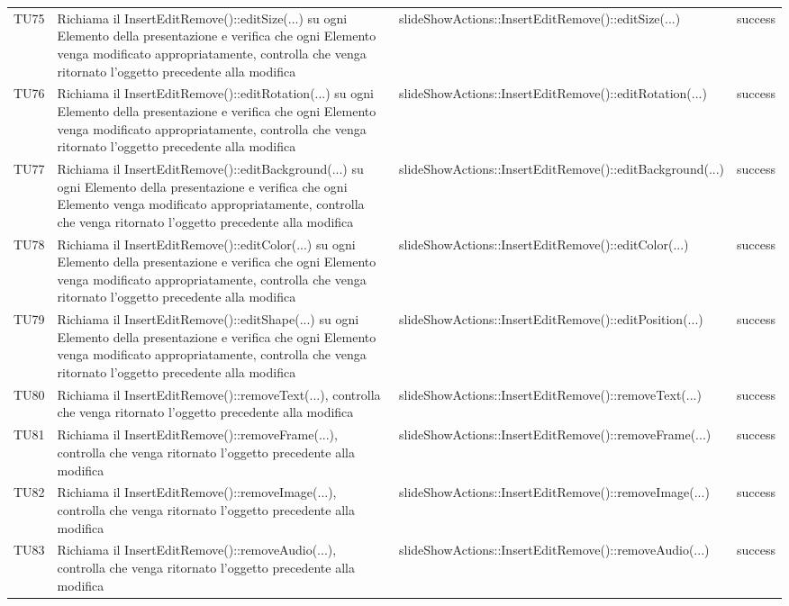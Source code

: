 \begin{longtable} [c]{| p{2cm} | p{6cm} |p{3cm} | p{2cm} |}
		 		 TU75 & Richiama il InsertEditRemove()::editSize(...) su ogni Elemento\ped{g} della presentazione e verifica che ogni Elemento\ped{g} venga modificato appropriatamente, controlla che venga ritornato l'oggetto precedente alla modifica   & slideShowActions::InsertEditRemove()::editSize(...) & success \\
		 		 TU76 & Richiama il InsertEditRemove()::editRotation(...) su ogni Elemento\ped{g} della presentazione e verifica che ogni Elemento\ped{g} venga modificato appropriatamente, controlla che venga ritornato l'oggetto precedente alla modifica   & slideShowActions::InsertEditRemove()::editRotation(...) & success \\
		 		 TU77 & Richiama il InsertEditRemove()::editBackground(...) su ogni Elemento\ped{g} della presentazione e verifica che ogni Elemento\ped{g} venga modificato appropriatamente, controlla che venga ritornato l'oggetto precedente alla modifica   & slideShowActions::InsertEditRemove()::editBackground(...) & success \\
		 		 TU78 & Richiama il InsertEditRemove()::editColor(...) su ogni Elemento\ped{g} della presentazione e verifica che ogni Elemento\ped{g} venga modificato appropriatamente, controlla che venga ritornato l'oggetto precedente alla modifica   & slideShowActions::InsertEditRemove()::editColor(...) & success \\
		 		 TU79 & Richiama il InsertEditRemove()::editShape(...) su ogni Elemento\ped{g} della presentazione e verifica che ogni Elemento\ped{g} venga modificato appropriatamente, controlla che venga ritornato l'oggetto precedente alla modifica   & slideShowActions::InsertEditRemove()::editPosition(...) & success \\
		 		 TU80 & Richiama il InsertEditRemove()::removeText(...), controlla che venga ritornato l'oggetto precedente alla modifica & slideShowActions::InsertEditRemove()::removeText(...) & success \\
		 		 TU81 & Richiama il InsertEditRemove()::removeFrame(...), controlla che venga ritornato l'oggetto precedente alla modifica & slideShowActions::InsertEditRemove()::removeFrame(...) & success \\
		 		 TU82 & Richiama il InsertEditRemove()::removeImage(...), controlla che venga ritornato l'oggetto precedente alla modifica & slideShowActions::InsertEditRemove()::removeImage(...) & success \\
		 		 TU83 & Richiama il InsertEditRemove()::removeAudio(...), controlla che venga ritornato l'oggetto precedente alla modifica & slideShowActions::InsertEditRemove()::removeAudio(...) & success \\

\end{longtable}
